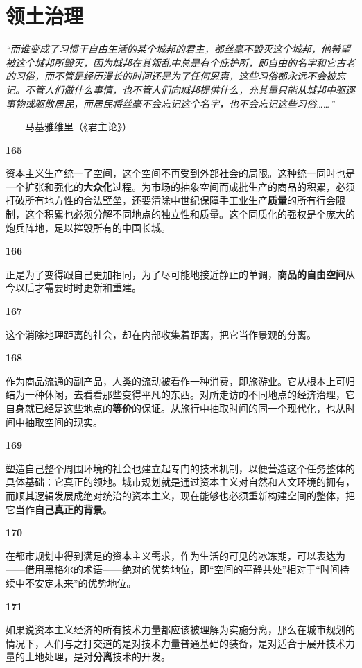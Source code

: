 \documentclass[fontset=fandol, a4paper, 12pt, openright]{ctexbook}
\makeatletter
\renewenvironment{quote}
  {\list{}{\rightmargin\leftmargin}%
   \item\relax\small\itshape\color{darkgray}}
  {\endlist}
\newcommand{\thesis}[1]{%
    \par\vspace{1.5em}%
    {\centering \textbf{\Large #1}\par}%
    \nobreak\vspace{0.5em}\nobreak
    \@afterindenttrue %
    \@afterheading    %
}
\makeatother
\begin{document}
\chapter{领土治理}

\begin{quote}
“而谁变成了习惯于自由生活的某个城邦的君主，都丝毫不毁灭这个城邦，他希望被这个城邦所毁灭，因为城邦在其叛乱中总是有个庇护所，即自由的名字和它古老的习俗，而不管是经历漫长的时间还是为了任何恩惠，这些习俗都永远不会被忘记。不管人们做什么事情，也不管人们向城邦提供什么，充其量只能从城邦中驱逐事物或驱散居民，而居民将丝毫不会忘记这个名字，也不会忘记这些习俗……”

\begin{flushright}
——马基雅维里（《君主论》）
\end{flushright}
\end{quote}

\thesis{165}
资本主义生产统一了空间，这个空间不再受到外部社会的局限。这种统一同时也是一个扩张和强化的\textbf{大众化}过程。为市场的抽象空间而成批生产的商品的积累，必须打破所有地方性的合法壁垒，还要清除中世纪保障手工业生产\textbf{质量}的所有行会限制，这个积累也必须分解不同地点的独立性和质量。这个同质化的强权是个庞大的炮兵阵地，足以摧毁所有的中国长城。

\thesis{166}
正是为了变得跟自己更加相同，为了尽可能地接近静止的单调，\textbf{商品的自由空间}从今以后才需要时时更新和重建。

\thesis{167}
这个消除地理距离的社会，却在内部收集着距离，把它当作景观的分离。

\thesis{168}
作为商品流通的副产品，人类的流动被看作一种消费，即旅游业。它从根本上可归结为一种休闲，去看看那些变得平凡的东西。对所走访的不同地点的经济治理，它自身就已经是这些地点的\textbf{等价}的保证。从旅行中抽取时间的同一个现代化，也从时间中抽取空间的现实。

\thesis{169}
塑造自己整个周围环境的社会也建立起专门的技术机制，以便营造这个任务整体的具体基础：它真正的领地。城市规划就是通过资本主义对自然和人文环境的拥有，而顺其逻辑发展成绝对统治的资本主义，现在能够也必须重新构建空间的整体，把它当作\textbf{自己真正的背景}。

\thesis{170}
在都市规划中得到满足的资本主义需求，作为生活的可见的冰冻期，可以表达为——借用黑格尔的术语——绝对的优势地位，即“空间的平静共处”相对于“时间持续中不安定未来”的优势地位。

\thesis{171}
如果说资本主义经济的所有技术力量都应该被理解为实施分离，那么在城市规划的情况下，人们与之打交道的是对技术力量普通基础的装备，是对适合于展开技术力量的土地处理，是对\textbf{分离}技术的开发。
\end{document}
